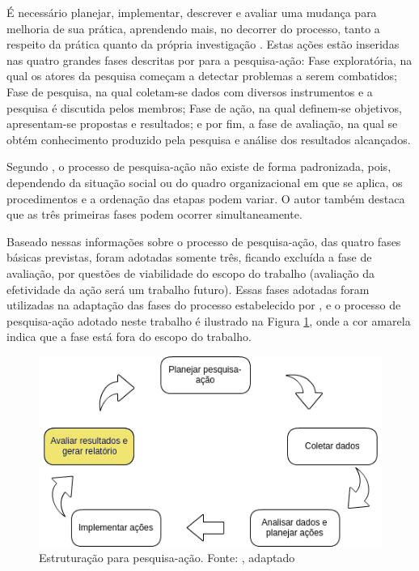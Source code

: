 É necessário planejar, implementar, descrever e avaliar uma mudança para melhoria de sua prática, aprendendo mais, no decorrer do processo, tanto a respeito da prática quanto da própria investigação \cite{tripp2005pesquisa}. Estas ações estão inseridas nas quatro grandes fases descritas por  para a pesquisa-ação: Fase exploratória, na qual os atores da pesquisa começam a detectar problemas a serem combatidos; Fase de pesquisa, na qual coletam-se dados com diversos instrumentos e a pesquisa é discutida pelos membros; Fase de ação, na qual definem-se objetivos, apresentam-se propostas e resultados; e por fim, a fase de avaliação, na qual se obtém conhecimento produzido pela pesquisa e análise dos resultados alcançados.

Segundo , o processo de pesquisa-ação não existe de forma padronizada, pois, dependendo da situação social ou do quadro organizacional em que se aplica, os procedimentos e a ordenação das etapas podem variar. O autor também destaca que as três primeiras fases podem ocorrer simultaneamente.

Baseado nessas informações sobre o processo de pesquisa-ação, das quatro fases básicas previstas, foram adotadas somente três, ficando excluída a fase de avaliação, por questões de viabilidade do escopo do trabalho (avaliação da efetividade da ação será um trabalho futuro). Essas fases adotadas foram utilizadas na adaptação das fases do processo estabelecido por , e o processo de pesquisa-ação adotado neste trabalho é ilustrado na Figura \ref{figura_pesquisa_acao}, onde a cor amarela indica que a fase está fora do escopo do trabalho.

\begin{figure}[!htb]
	\centering
	\includegraphics[scale=0.6]{figuras/estruturacao_pesquisa_acao_2}
	\caption{Estruturação para pesquisa-ação. Fonte: \cite{coughlan2002action}, adaptado}
	\label{figura_pesquisa_acao}
\end{figure}


